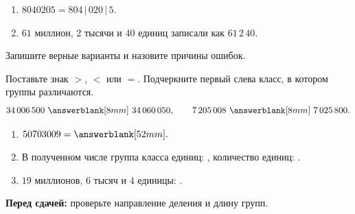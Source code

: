 \begin{warningbox}
  \begin{enumerate}[label=\textbf{\arabic*.}]
    \item \(8040205=804\,|\,020\,|\,5\).
    \item \(61\) миллион, \(2\) тысячи и \(40\) единиц записали как
      \(61\,2\,40\).
  \end{enumerate}
  Запишите верные варианты и назовите причины ошибок.
\end{warningbox}

\begin{practicebox}[6. Сравните]
  Поставьте знак \(>\), \(<\) или \(=\). Подчеркните первый слева класс, в
  котором группы различаются.
  \[
    34\,006\,500\ \answerblank[8mm]\ 34\,060\,050,
    \qquad
    7\,205\,008\ \answerblank[8mm]\ 7\,025\,800.
  \]
\end{practicebox}

\begin{checkpointbox}[7. Итог]
  \begin{enumerate}[label=\textbf{\arabic*.}]
    \item \(50703009=\answerblank[52mm].\)
    \item В полученном числе группа класса единиц: \answerblank[16mm],
      количество единиц: \answerblank[16mm].
    \item \(19\) миллионов, \(6\) тысяч и \(4\) единицы:
      \answerblank[48mm].
  \end{enumerate}
  \textbf{Перед сдачей:} проверьте направление деления и длину групп.
\end{checkpointbox}

